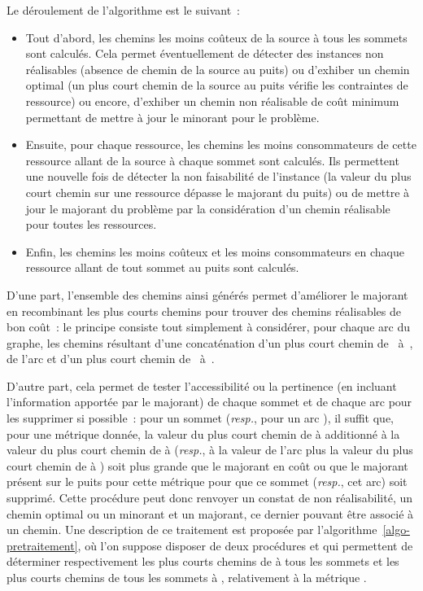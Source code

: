 \documentclass[10pt,francais]{llncs}
\begin{document}
\noindent Le d\'eroulement de l'algorithme est le suivant~:
\begin{itemize}
 \item Tout d'abord, les chemins les moins co\^uteux de la source \`a tous les sommets sont calcul\'es. Cela permet \'eventuellement de d\'etecter des instances non r\'ealisables (absence de chemin de la source au puits) ou d'exhiber un chemin optimal (un plus court chemin de la source au puits v\'erifie les contraintes de ressource) ou encore, d'exhiber un chemin non r\'ealisable de co\^ut minimum permettant de mettre \`a jour le minorant pour le probl\`eme.
 \item Ensuite, pour chaque ressource, les chemins les moins consommateurs de cette ressource allant de la source \`a chaque sommet sont calcul\'es. Ils permettent une nouvelle fois de d\'etecter la non faisabilit\'e de l'instance (la valeur du plus court chemin sur une ressource d\'epasse le majorant du puits) ou de mettre \`a jour le majorant du probl\`eme par la consid\'eration d'un chemin r\'ealisable pour toutes les ressources.
 \item Enfin, les chemins les moins co\^uteux et les moins consommateurs en chaque ressource allant de tout sommet au puits sont calcul\'es.
\end{itemize}
D'une part, l'ensemble des chemins ainsi g\'en\'er\'es permet d'am\'eliorer le majorant en recombinant les plus courts chemins pour trouver des chemins r\'ealisables de bon co\^ut~: le principe consiste tout simplement \`a consid\'erer, pour chaque arc  du graphe, les chemins r\'esultant d'une concat\'enation d'un plus court chemin de ~\`a~, de l'arc  et d'un plus court chemin de ~\`a~.

D'autre part, cela permet de tester l'accessibilit\'e ou la pertinence (en incluant l'information apport\'ee par le majorant) de chaque sommet et de chaque arc pour les supprimer si possible~: pour un sommet  ({\em resp.}, pour un arc ), il suffit que, pour une m\'etrique donn\'ee, la valeur du plus court chemin de  \`a  additionn\'e \`a la valeur du plus court chemin de  \`a  ({\em resp.}, \`a la valeur de l'arc  plus la valeur du plus court chemin de  \`a ) soit plus grande que le majorant en co\^ut ou que le majorant pr\'esent sur le puits pour cette m\'etrique pour que ce sommet ({\em resp.}, cet arc) soit supprim\'e.
Cette proc\'edure peut donc renvoyer un constat de non r\'ealisabilit\'e, un chemin optimal ou un minorant et un majorant, ce dernier pouvant \^etre associ\'e \`a un chemin. Une description de ce traitement est propos\'ee par l'algorithme~\ref{algo-pretraitement}, o\`u l'on suppose disposer de deux proc\'edures  et   qui permettent de d\'eterminer respectivement les plus courts chemins de  \`a tous les sommets et les plus courts chemins de tous les sommets \`a , relativement \`a la m\'etrique .\\
\end{document}
